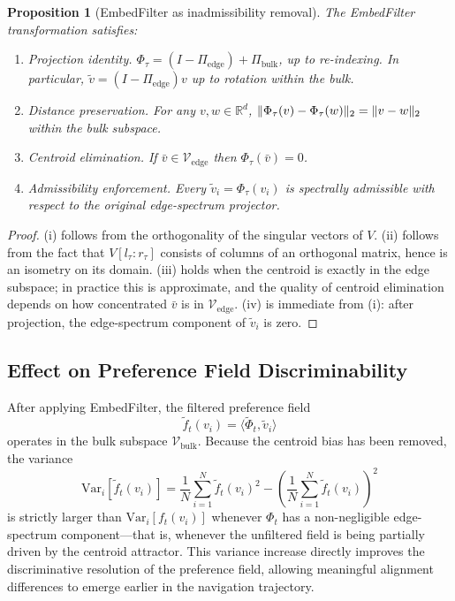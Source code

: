 \documentclass[12pt, a4paper]{article}
\DeclarePairedDelimiter{\norm}{\lVert}{\rVert}
\theoremstyle{plain}
\newtheorem{proposition}{Proposition}[section]
\theoremstyle{definition}
\begin{document}
\begin{proposition}[EmbedFilter as inadmissibility removal]
\label{prop:embedfilter}
The EmbedFilter transformation satisfies:
\begin{enumerate}
  \item[(i)] \emph{Projection identity.} $\Phi_\tau = (I -
    \Pi_{\mathrm{edge}}) + \Pi_{\mathrm{bulk}}$, up to
    re-indexing. In particular, $\tilde{v} = (I -
    \Pi_{\mathrm{edge}})v$ up to rotation within the bulk.
  \item[(ii)] \emph{Distance preservation.} For any $v, w \in \mathbb{R}^d$,
    $\norm{\Phi_\tau(v) - \Phi_\tau(w)}_2 = \norm{v - w}_2$ within the
    bulk subspace.
  \item[(iii)] \emph{Centroid elimination.} If $\bar{v} \in
    \mathcal{V}_{\mathrm{edge}}$ then $\Phi_\tau(\bar{v}) = 0$.
  \item[(iv)] \emph{Admissibility enforcement.} Every $\tilde{v}_i =
    \Phi_\tau(v_i)$ is spectrally admissible with respect to the original
    edge-spectrum projector.
\end{enumerate}
\end{proposition}

\begin{proof}
(i) follows from the orthogonality of the singular vectors of $V$.
(ii) follows from the fact that $V[l_\tau : r_\tau]$ consists of columns of an
orthogonal matrix, hence is an isometry on its domain. (iii) holds when the
centroid is exactly in the edge subspace; in practice this is approximate,
and the quality of centroid elimination depends on how concentrated $\bar{v}$
is in $\mathcal{V}_{\mathrm{edge}}$. (iv) is immediate from (i): after
projection, the edge-spectrum component of $\tilde{v}_i$ is zero.
\end{proof}

\subsection{Effect on Preference Field Discriminability}

After applying EmbedFilter, the filtered preference field
\begin{equation}
  \tilde{f}_t(v_i) = \langle \tilde{\Phi}_t, \tilde{v}_i \rangle
\end{equation}
operates in the bulk subspace $\mathcal{V}_{\mathrm{bulk}}$. Because the
centroid bias has been removed, the variance
\begin{equation}
  \mathrm{Var}_i[\tilde{f}_t(v_i)] = \frac{1}{N}\sum_{i=1}^N
  \tilde{f}_t(v_i)^2 - \left(\frac{1}{N}\sum_{i=1}^N \tilde{f}_t(v_i)\right)^2
\end{equation}
is strictly larger than $\mathrm{Var}_i[f_t(v_i)]$ whenever $\Phi_t$ has
a non-negligible edge-spectrum component---that is, whenever the
unfiltered field is being partially driven by the centroid attractor. This
variance increase directly improves the discriminative resolution of the
preference field, allowing meaningful alignment differences to emerge earlier
in the navigation trajectory.
\end{document}
